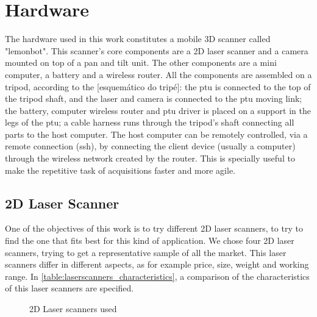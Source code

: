 \section{Hardware}
\label{section:hardware}

The hardware used in this work constitutes a mobile 3D scanner called "lemonbot". This scanner's core components are a 2D laser scanner and a camera mounted on top of a pan and tilt unit. The other components are a mini computer, a battery and a wireless router. All the components are assembled on a tripod, according to the [esquemático do tripé]: the ptu is connected to the top of the tripod shaft, and the laser and camera is connected to the ptu moving link; the battery, computer wireless router and ptu driver is placed on a support in the legs of the ptu; a cable harness runs through the tripod's shaft connecting all parts to the host computer.
The host computer can be remotely controlled, via a remote connection (ssh), by connecting the client device (usually a computer) through the wireless network created by the router. This is specially useful to make the repetitive task of acquisitions faster and more agile.

\subsection{2D Laser Scanner}

One of the objectives of this work is to try different 2D laser scanners, to try to find the one that fits best for this kind of application. We chose four 2D laser scanners, trying to get a representative sample of all the market. This laser scanners differ in different aspects, as for example price, size, weight and working range. In \cref{table:laserscanners_characteristics}, a comparison of the characteristics of this laser scanners are specified. 

\begin{figure}
    \centering
    \qquad\qquad

    \qquad\qquad

    \caption{2D Laser scanners used}
    \label{figure:laserscanners}
\end{figure}



